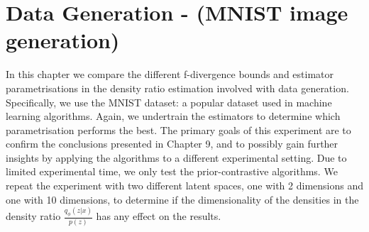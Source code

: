 \documentclass[honours,12pt]{unswthesis}
\numberwithin{equation}{section}
\theoremstyle{definition}
\begin{document}
\chapter{Data Generation - (MNIST image generation)}
In this chapter we compare the different f-divergence bounds and estimator parametrisations in the density ratio estimation involved with data generation. Specifically, we use the MNIST dataset: a popular dataset used in machine learning algorithms. Again, we undertrain the estimators to determine which parametrisation performs the best. The primary goals of this experiment are to confirm the conclusions presented in Chapter 9, and to possibly gain further insights by applying the algorithms to a different experimental setting. Due to limited experimental time, we only test the prior-contrastive algorithms. We repeat the experiment with two different latent spaces, one with 2 dimensions and one with 10 dimensions, to determine if the dimensionality of the densities in the density ratio $\frac{q_\phi(z|x)}{p(z)}$ has any effect on the results.
\end{document}
